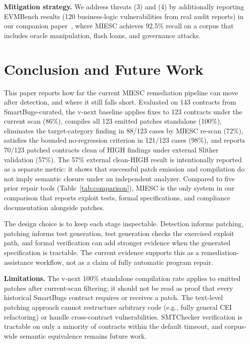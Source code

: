 \documentclass[conference]{IEEEtran}
\begin{document}
\textbf{Mitigation strategy.} We address threats (3) and (4) by additionally reporting EVMBench results (120 business-logic vulnerabilities from real audit reports) in our companion paper~\cite{boiero2025miesc}, where MIESC achieves 92.5\% recall on a corpus that includes oracle manipulation, flash loans, and governance attacks.

\section{Conclusion and Future Work}

This paper reports how far the current MIESC remediation pipeline can move after detection, and where it still falls short. Evaluated on 143 contracts from SmartBugs-curated, the v-next baseline applies fixes to 123 contracts under the current scan (86\%), compiles all 123 emitted patches standalone (100\%), eliminates the target-category finding in 88/123 cases by MIESC re-scan (72\%), satisfies the bounded no-regression criterion in 121/123 cases (98\%), and reports 70/123 patched contracts clean of HIGH findings under external Slither validation (57\%). The 57\% external clean-HIGH result is intentionally reported as a separate metric: it shows that successful patch emission and compilation do not imply semantic closure under an independent analyzer. Compared to five prior repair tools (Table~\ref{tab:comparison}), MIESC is the only system in our comparison that reports exploit tests, formal specifications, and compliance documentation alongside patches.

The design choice is to keep each stage inspectable. Detection informs patching, patching informs test generation, test generation checks the exercised exploit path, and formal verification can add stronger evidence when the generated specification is tractable. The current evidence supports this as a remediation-assistance workflow, not as a claim of fully automatic program repair.

\textbf{Limitations.} The v-next 100\% standalone compilation rate applies to emitted patches after current-scan filtering; it should not be read as proof that every historical SmartBugs contract requires or receives a patch. The text-level patching approach cannot restructure arbitrary code (e.g., fully general CEI refactoring) or handle cross-contract vulnerabilities. SMTChecker verification is tractable on only a minority of contracts within the default timeout, and corpus-wide semantic equivalence remains future work.
\end{document}
